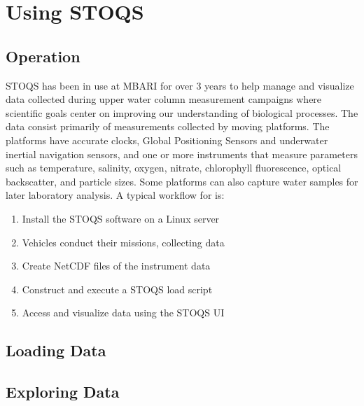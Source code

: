 \section{Using STOQS}

\subsection{Operation}

STOQS has been in use at MBARI for over 3 years to help manage and visualize data collected during upper water column measurement campaigns where scientific goals center on improving our understanding of biological processes. The data consist primarily of measurements collected by moving platforms. The platforms have accurate clocks, Global Positioning Sensors and underwater inertial navigation sensors, and one or more instruments that measure parameters such as temperature, salinity, oxygen, nitrate, chlorophyll fluorescence, optical backscatter, and particle sizes. Some platforms can also capture water samples for later laboratory analysis. A typical workflow for is:
\begin{enumerate}
\item Install the STOQS software on a Linux server
\item Vehicles conduct their missions, collecting data
\item Create NetCDF files of the instrument data
\item Construct and execute a STOQS load script
\item Access and visualize data using the STOQS UI
\end{enumerate}


\subsection{Loading Data}

\subsection{Exploring Data}

